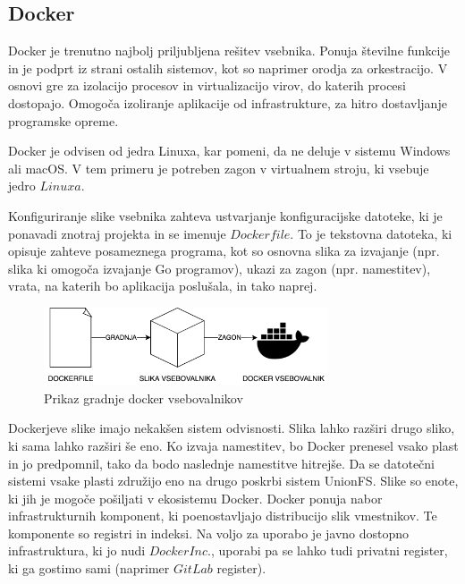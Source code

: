\documentclass[a4paper, 12pt]{book}
\begin{document}
\subsection{Docker}
Docker je trenutno najbolj priljubljena rešitev vsebnika. Ponuja številne funkcije in je podprt iz strani ostalih sistemov, kot so naprimer orodja za orkestracijo. V osnovi gre za izolacijo procesov in virtualizacijo virov, do katerih procesi dostopajo. Omogoča izoliranje aplikacije od infrastrukture, za hitro dostavljanje programske opreme. \cite{linuxcontainers} 

Docker je odvisen od jedra Linuxa, kar pomeni, da ne deluje v sistemu Windows ali macOS. V tem primeru je potreben zagon v virtualnem stroju, ki vsebuje jedro $Linuxa$. \cite{docker-in-action}

Konfiguriranje slike vsebnika zahteva ustvarjanje konfiguracijske datoteke, ki je ponavadi znotraj projekta in se imenuje $Dockerfile$. To je tekstovna datoteka, ki opisuje zahteve posameznega programa, kot so osnovna slika za izvajanje (npr. slika ki omogoča izvajanje Go programov), ukazi za zagon (npr. namestitev), vrata, na katerih bo aplikacija poslušala, in tako naprej.

\begin{figure}[h]
\begin{center}
\includegraphics[width=0.75\textwidth]{slike/docker-flow.png}
\end{center}
\caption{ Prikaz gradnje docker vsebovalnikov }
\label{password-reset-form}
\end{figure}

Dockerjeve slike imajo nekakšen sistem odvisnosti. Slika lahko razširi drugo sliko, ki sama lahko razširi še eno. Ko izvaja namestitev, bo Docker prenesel vsako plast in jo predpomnil, tako da bodo naslednje namestitve hitrejše. Da se datotečni sistemi vsake plasti združijo eno na drugo poskrbi sistem UnionFS.  Slike so enote, ki jih je mogoče pošiljati v ekosistemu Docker. Docker ponuja nabor infrastrukturnih komponent, ki poenostavljajo distribucijo slik vmestnikov. Te komponente so registri in indeksi. Na voljo za uporabo je javno dostopno infrastruktura, ki jo nudi $Docker Inc.$, uporabi pa se lahko tudi privatni register, ki ga gostimo sami (naprimer $GitLab$ register).
\end{document}
